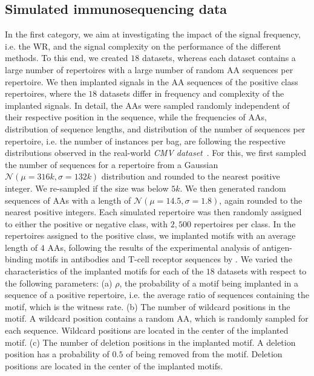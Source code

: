 \documentclass[oneside]{book}
\begin{document}
\subsection{Simulated immunosequencing data}
%

%
In the first category,
we aim at investigating the impact of the signal frequency, i.e. the WR, and the signal 
complexity on the performance of the different methods.
%
To this end, we created $18$ datasets,
whereas each dataset contains a large number of repertoires
with a large number of random AA sequences per repertoire.
We then implanted signals in the AA sequences of the positive class repertoires,
where the $18$ datasets differ in frequency and complexity of the implanted signals.
%
In detail, the AAs were sampled randomly independent of their respective position in the sequence,
while the frequencies of AAs, 
distribution of sequence lengths, 
and distribution of the number of sequences per repertoire,
i.e. the number of instances per bag, are 
following the respective distributions observed in the real-world \emph{CMV dataset}~\citep{emerson2017immunosequencing}.
For this, we first sampled the number of sequences for a repertoire from 
a Gaussian $\mathcal N(\mu=316k, \sigma=132k)$ distribution and 
rounded to the nearest positive integer.
We re-sampled if the size was below $5k$. 
We then generated random sequences of AAs with a length of $\mathcal N(\mu=14.5, \sigma=1.8)$,
again rounded to the nearest positive integers.
Each simulated repertoire was then randomly assigned to
either the positive or negative class,
with $2,500$ repertoires per class.
%
In the repertoires assigned to the positive class,
we implanted motifs with an average length of $4$ AAs,
following the results of the experimental analysis of antigen-binding motifs in antibodies and T-cell receptor sequences by \citep{akbar2019compact}.
We varied the characteristics of the implanted motifs for each of the $18$ datasets with respect to the following parameters:
%
(a) $\rho$, the probability of a motif being implanted in a sequence of a positive repertoire, 
i.e. the average ratio of sequences containing the motif, which is the witness rate.  
(b) The number of wildcard positions in the motif.
A wildcard position contains a random AA, which is randomly sampled for each sequence.
Wildcard positions are located in the center of the implanted motif.
(c) The number of deletion positions in the implanted motif.
A deletion position has a probability of $0.5$ of being removed from the motif. 
Deletion positions are located in the center of the implanted motifs. 
\end{document}
